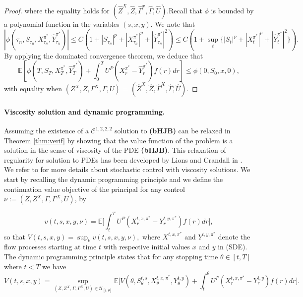 \documentclass[11pt,a4paper]{article}
\theoremstyle{thmstyleone}%
\theoremstyle{thmstyletwo}%
\theoremstyle{thmstylethree}%
\newcommand{\E}{\mathbb{E}}
\begin{document}
\begin{proof}
where the equality holds for $(\hat{Z}^X,\hat{Z},\hat{\Gamma}^x,\hat{\Gamma},\hat{U})$.Recall that $\phi$ is bounded by a polynomial function in the variables $(s, x, y)$. We note that \[
    |\phi(\tau_n, S_{\tau_n}, X^{\pi^*}_{\tau_n}, \hat Y^{\pi^*}_{\tau_n})| \leq C(1 + |S_{\tau_n}|^p + |X^{\pi^*}_{\tau_n}|^p + | \hat Y^{\pi^*}_{\tau_n}|^2)
    \leq C(1 + \sup_{t} \{|S_t|^p + |X^{\pi^*}_{t}|^p + | \hat Y^{\pi^*}_{t}|^2 \}).
\]By applying the dominated convergence theorem, we deduce that
\[
   \mathbb{E}[\phi(T, S_{T}, X^{\pi^*}_{T}, \hat Y^{\pi^*}_{T})+\int_{0}^{T}U^P(X^{\pi^*}_r -  \hat Y^{\pi^*}_r)f(r) dr]  \leq  \phi(0, S_0, x,0),
\]
with equality when $ (Z^X,Z,\Gamma^X,\Gamma,U)$ = $(\hat{Z}^X,\hat{Z},\hat{\Gamma}^X,\hat{\Gamma},\hat{U})$.

\end{proof}


\paragraph{Viscosity solution and dynamic programming.} Assuming the existence of a $\mathcal C^{1,2,2,2}$ solution to \textbf{(bHJB)} can be relaxed in Theorem \eqref{thm:verif} by showing that the value function of the problem is a solution in the sense of viscosity of the PDE \textbf{(bHJB)}. This relaxation of regularity for solution to PDEs has been developed by Lions and Crandall in \cite{crandall1983viscosity,crandall1992user}. We refer to  \cite{fleming2006controlled,touzi2012optimal} for more details about stochastic control with viscosity solutions. We start by recalling the dynamic programming principle and we define the continuation value objective of the principal for any control $\nu:=(Z,Z^X,\Gamma,\Gamma^X,U)$, by

\begin{equation*}
  v(t,s,x,y,\nu)=  \E\bigl[ \int_{t}^T U^P(X^{t,x,\pi^*}_r - Y^{t,y,\pi^*}_r) f(r)dr \bigl],
\end{equation*}
so that $V(t,s,x,y)=\sup_\nu v(t,s,x,y,\nu),$
where $X^{t,x,\pi^*}$ and $Y^{t,y,\pi^*}$ denote the flow processes starting at time $t$ with respective initial values $x$ and $y$ in (SDE). The dynamic programming principle states that
for any stopping time $\theta\in [t,T]$ where $t<T$ we have
\begin{equation}\label{DPP}
  V(t,s,x,y)= \sup_{(Z,Z^X,\Gamma,\Gamma^X,U)\in \mathcal U_{[t,\theta]}} \E\bigl[ V(\theta, S_\theta^{t,s},X_\theta^{t,x,\pi^*},Y_\theta^{t,y}) + \int_{t}^\theta U^P(X^{t,x,\pi^*}_r - {Y}^{t,y}_r) f(r)dr \bigl].
\end{equation}
\end{document}
